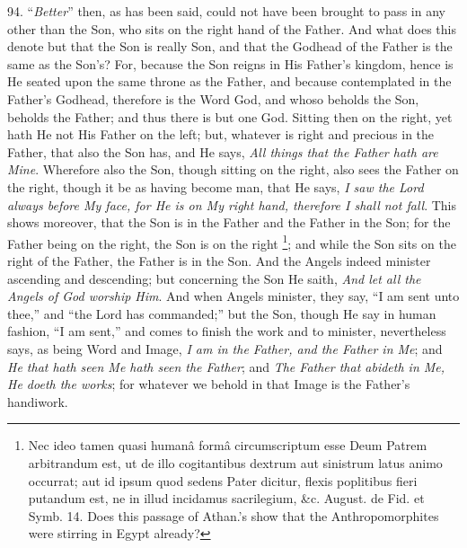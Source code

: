 94. ``\emph{Better}'' then, as
has been said, could not have been brought to pass in any other than
the Son, who sits on the right hand of the Father. And what does this
denote but that the Son is really Son, and that the Godhead of the
Father is the same as the Son's? For, because the Son reigns in His
Father's kingdom, hence is He seated upon the same throne as the
Father, and because contemplated in the Father's Godhead, therefore is
the Word God, and whoso beholds the Son, beholds the Father; and thus
there is but one God. Sitting then on the right, yet hath He not His
Father on the left; but, whatever is right and precious in the Father,
that also the Son has, and He says, \emph{All things that the Father hath
are Mine}. Wherefore also the Son, though sitting on the right,
also sees the Father on the right, though it be as having become man,
that He says, \emph{I saw the Lord always before My face, for He is
on My right hand, therefore I shall not fall}. This shows moreover,
that the Son is in the Father and the Father in the Son; for the
Father being on the right, the Son is on the right \footnote{Nec ideo tamen quasi humanâ formâ circumscriptum esse Deum Patrem
arbitrandum est, ut de illo cogitantibus dextrum aut sinistrum latus
animo occurrat; aut id ipsum quod sedens Pater dicitur, flexis
poplitibus fieri putandum est, ne in illud incidamus sacrilegium,
\&c. August. de Fid. et Symb. 14. Does this passage of Athan.'s
show that the Anthropomorphites were stirring in Egypt already?}; and while the Son sits on the right of the Father, the Father
is in the Son. And the Angels indeed minister ascending and
descending; but concerning the Son He saith, \emph{And let all the Angels
of God worship Him}. And when Angels minister, they say, ``I am sent
unto thee,'' and ``the Lord has commanded;'' but the Son, though He say
in human fashion, ``I am sent,'' and comes to finish the work and to
minister, nevertheless says, as being Word and Image, \emph{I am in the
Father, and the Father in Me}; and \emph{He that hath seen Me hath
seen the Father}; and \emph{The Father that abideth in Me, He doeth
the works}; for whatever we behold in that Image is the Father's
handiwork.

